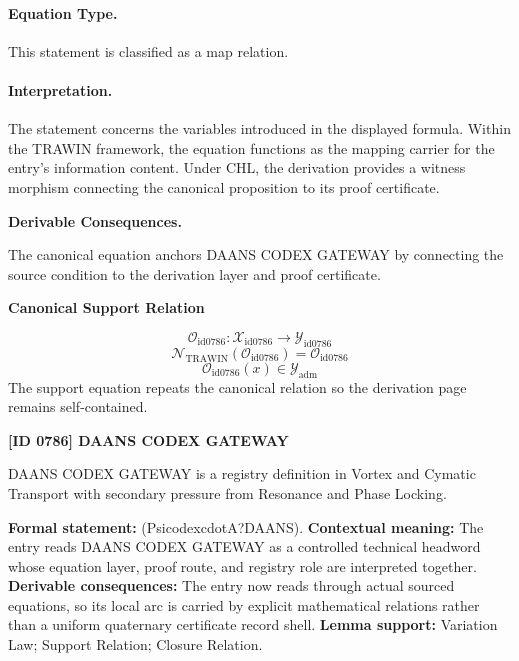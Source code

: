 \paragraph{Equation Type.}
This statement is classified as a map relation.

\paragraph{Interpretation.}
The statement concerns the variables introduced in the displayed formula. Within the TRAWIN framework, the equation functions as the mapping carrier for the entry’s information content. Under CHL, the derivation provides a witness morphism connecting the canonical proposition to its proof certificate.

\par\vspace{0.35em}
\noindent\textbf{Derivable Consequences.}\quad
\begingroup
\footnotesize
\raggedright
The canonical equation anchors DAANS CODEX GATEWAY by connecting the source condition to the derivation layer and proof certificate.
\par\endgroup

\noindent\textbf{Canonical Support Relation}\par
\[
\mathcal{O}_{\mathrm{id0786}}:\mathcal{X}_{\mathrm{id0786}}\longrightarrow\mathcal{Y}_{\mathrm{id0786}}
\]
\[
\mathcal{N}_{\mathrm{TRAWIN}}(\mathcal{O}_{\mathrm{id0786}})=\mathcal{O}_{\mathrm{id0786}}
\]
\[
\mathcal{O}_{\mathrm{id0786}}(x)\in\mathcal{Y}_{\mathrm{adm}}
\]
\noindent The support equation repeats the canonical relation so the derivation page remains self-contained.\par

\clearpage
\noindent\textbf{[ID 0786] DAANS CODEX GATEWAY}\par
\vspace{0.35em}
\begingroup\small
{}
DAANS CODEX GATEWAY is a registry definition in Vortex and Cymatic Transport with secondary pressure from Resonance and Phase Locking.

\begingroup\footnotesize\setlength{\emergencystretch}{3em}\sloppy
\textbf{Formal statement:} (PsicodexcdotA?DAANS). \textbf{Contextual meaning:} The entry reads DAANS CODEX GATEWAY as a controlled technical headword whose equation layer, proof route, and registry role are interpreted together. \textbf{Derivable consequences:} The entry now reads through actual sourced equations, so its local arc is carried by explicit mathematical relations rather than a uniform quaternary certificate record shell. \textbf{Lemma support:} Variation Law; Support Relation; Closure Relation.\par
\endgroup

